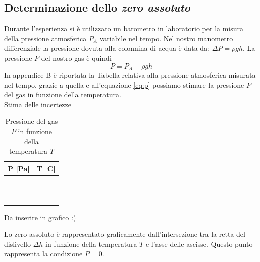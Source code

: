 \subsection{Determinazione dello \emph{zero assoluto}}
Durante l'esperienza si è utilizzato un barometro in laboratorio per la misura della pressione atmosferica $P_A$ variabile nel tempo. Nel nostro manometro differenziale la pressione dovuta alla colonnina di acqua è data da: $\Delta P = \rho gh$. 
La pressione $P$ del nostro gas è quindi 
\begin{equation}
\label{eq:p}
P = P_A + \rho gh
\end{equation}
In appendice B è riportata la Tabella relativa alla pressione atmosferica misurata nel tempo, grazie a quella e all'equazione \eqref{eq:p} possiamo stimare la pressione $P$ del gas in funzione della temperatura.\\
Stima delle incertezze\\
\begin{table}[H]
	\centering
	\begin{tabular}{|c|c|} \hline
		\textbf{P {[Pa]} } & \textbf{T {[\degree C]} }  \\ \hline
		 &   \\ \hline
		 &   \\ \hline
		 &   \\ \hline
		 &   \\ \hline
		 &   \\ \hline
		 &   \\ \hline
		 &   \\ \hline
		 &   \\ \hline
		 &   \\ \hline
		 &   \\ \hline
		 &   \\ \hline
	\end{tabular}
	\caption{Pressione del gas $P$ in funzione della temperatura $T$}
\end{table}

Da inserire in grafico :)

Lo zero assoluto è rappresentato graficamente dall'intersezione tra la retta del dislivello $\Delta h$ in funzione della temperatura $T$ e l'asse delle ascisse.
Questo punto rappresenta la condizione $P = 0$.
